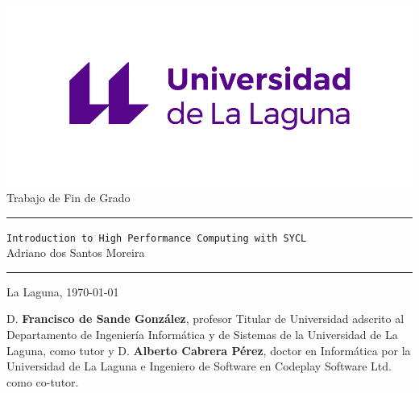 \documentclass[english,a4paper,12pt,oneside]{extreport}
\newcommand{\TitleTopic}{\texttt{Introduction to High Performance Computing with SYCL}}
\begin{document}
\renewcommand{\lstlistingname}{Listing}%
\pagestyle{empty}
\thispagestyle{empty}

\newcommand{\HRule}{\rule{\linewidth}{1mm}}
\setlength{\parindent}{0mm}
\setlength{\parskip}{0mm}


\begin{center}
\includegraphics[scale=1.1]{images/marca-universidad-de-la-laguna-original}\\[15mm]
{\Huge Trabajo de Fin de Grado}
\end{center}

\HRule
\begin{flushright}
        {\Huge \TitleTopic{}} \\[2.5mm]
        {\Large Adriano dos Santos Moreira} \\[5mm]


\end{flushright}
\HRule
{}
\begin{center}
  \Large La Laguna, {\today} 
\end{center}
\setlength{\parindent}{5mm}
\newpage
\thispagestyle{empty}

D. {\bf Francisco de Sande González}, profesor Titular de Universidad
adscrito al Departamento de Ingeniería Informática y de Sistemas de la Universidad de La Laguna, como tutor y D. \textbf{Alberto Cabrera Pérez}, doctor en Informática por la Universidad de La Laguna e Ingeniero de Software en Codeplay Software Ltd. como co-tutor.
\end{document}
